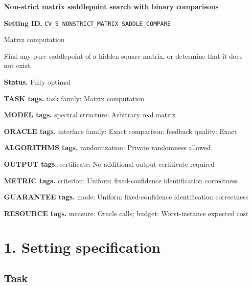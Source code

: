 \documentclass[10pt,a4paper]{article}
\begin{document}
\raggedright

{\LARGE\bfseries\sffamily\color{AtlasNavy} Non-strict matrix saddlepoint search with binary comparisons\par}\vspace{5pt}


\textbf{Setting ID.} \texttt{CV\_\allowbreak{}S\_\allowbreak{}NONSTRICT\_\allowbreak{}MATRIX\_\allowbreak{}SADDLE\_\allowbreak{}COMPARE}



Matrix computation



Find any pure saddlepoint of a hidden square matrix, or determine that it does not exist.



\textbf{Status.} Fully optimal



\textbf{TASK tags.} task family: Matrix computation



\textbf{MODEL tags.} spectral structure: Arbitrary real matrix



\textbf{ORACLE tags.} interface family: Exact comparison; feedback quality: Exact



\textbf{ALGORITHMS tags.} randomization: Private randomness allowed



\textbf{OUTPUT tags.} certificate: No additional output certificate required



\textbf{METRIC tags.} criterion: Uniform fixed-confidence identification correctness



\textbf{GUARANTEE tags.} mode: Uniform fixed-confidence identification correctness



\textbf{RESOURCE tags.} measure: Oracle calls; budget: Worst-instance expected cost



\section{1. Setting specification}


\subsection{Task}
\end{document}

